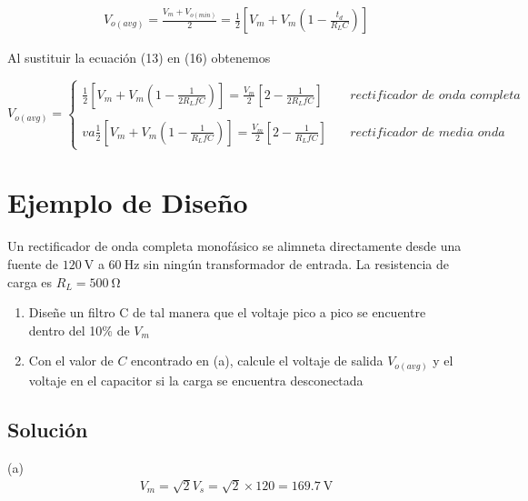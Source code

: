\documentclass{article}
\begin{document}
\begin{align}
	V_{o(avg)} = \frac{V_m + V_{o(min)}}{2} = \frac{1}{2} \left[ V_m + V_m \left( 1 - \frac{t_d}{R_L C} \right) \right]
\end{align} 

Al sustituir la ecuación (13) en (16) obtenemos

\begin{tcolorbox}[colback=red!5!white,colframe=red!75!black,arc=0mm,boxrule=0mm,width=(\linewidth+0.5cm)]
	\begin{equation}
		V_{o(avg)} =   
		\begin{cases}
			\frac{1}{2} \left[ V_m + V_m \left( 1 - \frac{1}{2R_L fC} \right) \right]= \frac{V_m}{2} \left[ 2 - \frac{1}{2R_L fC} \right] \quad & rectificador \,\, de \,\, onda \,\, completa\\\\va
			\frac{1}{2} \left[ V_m + V_m \left( 1 - \frac{1}{R_L fC} \right) \right]= \frac{V_m}{2} \left[ 2 - \frac{1}{R_L fC} \right] \quad & rectificador \,\, de \,\, media \,\, onda
		\end{cases}
	\end{equation}
\end{tcolorbox}

\section*{Ejemplo de Diseño}
Un rectificador de onda completa monofásico se alimneta directamente desde una fuente de $\qty{120}{\volt}$ a $\qty{60}{\hertz}$ sin ningún transformador de entrada. La resistencia de carga es $R_L = \qty{500}{\ohm}$
\begin{enumerate}[label=\alph*)]
	\item Diseñe un filtro C de tal manera que el voltaje pico a pico se encuentre dentro del 10\% de $V_m$
	\item Con el valor de $C$ encontrado en (a), calcule el voltaje de salida $V_{o(avg)}$ y el voltaje en el capacitor si la carga se encuentra desconectada
\end{enumerate}

\subsection*{Solución}
\noindent (a)
\begin{align}
	V_m = \sqrt{2}V_s = \sqrt{2} \times 120 = \qty{169.7}{\volt} \nonumber
\end{align}
\end{document}
